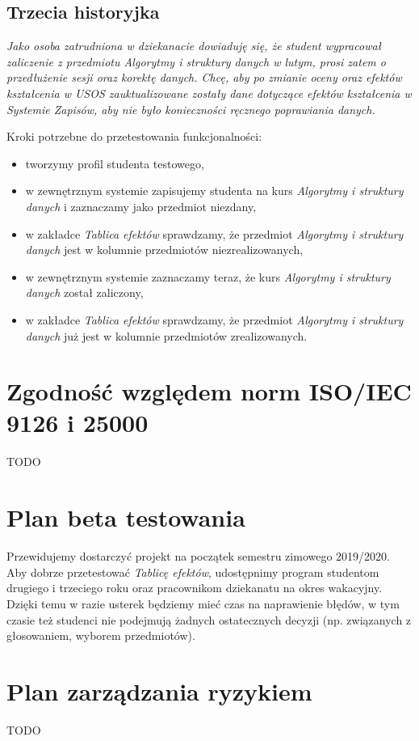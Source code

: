\documentclass{article}
\begin{document}
\subsection{Trzecia historyjka}
\textit{Jako osoba zatrudniona w dziekanacie dowiaduję się, że student wypracował zaliczenie z przedmiotu \textit{Algorytmy i struktury danych} w lutym, prosi zatem o przedłużenie sesji oraz korektę danych. 
Chcę, aby po zmianie oceny oraz efektów kształcenia w USOS zauktualizowane zostały dane dotyczące efektów kształcenia w Systemie Zapisów, aby nie było konieczności ręcznego poprawiania danych.}

\medskip
\noindent Kroki potrzebne do przetestowania funkcjonalności:
\begin{itemize}
 \item tworzymy profil studenta testowego,
 \item w zewnętrznym systemie zapisujemy studenta na kurs \textit{Algorytmy i struktury danych} i zaznaczamy jako przedmiot niezdany,
 \item w zakładce \textit{Tablica efektów} sprawdzamy, że przedmiot \textit{Algorytmy i struktury danych} jest w kolumnie przedmiotów niezrealizowanych,
 \item w zewnętrznym systemie zaznaczamy teraz, że kurs \textit{Algorytmy i struktury danych} został zaliczony,
 \item w zakładce \textit{Tablica efektów} sprawdzamy, że przedmiot \textit{Algorytmy i struktury danych} już jest w kolumnie przedmiotów zrealizowanych.
\end{itemize}

\section{Zgodność względem norm ISO/IEC 9126 i 25000}
TODO

\section{Plan beta testowania}
Przewidujemy dostarczyć projekt na początek semestru zimowego 2019/2020.
Aby dobrze przetestować \textit{Tablicę efektów}, udostępnimy program studentom drugiego i trzeciego roku oraz pracownikom dziekanatu na okres wakacyjny.
Dzięki temu w razie usterek będziemy mieć czas na naprawienie błędów, w tym czasie też studenci nie podejmują żadnych ostatecznych decyzji (np. związanych z głosowaniem, wyborem przedmiotów).

\section{Plan zarządzania ryzykiem}
TODO
\end{document}
